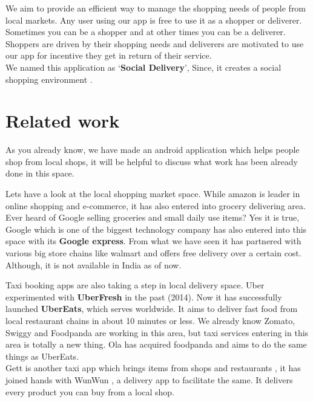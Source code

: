 \documentclass{report}
\begin{document}
We aim to provide an efficient way to manage the shopping needs of people from local markets. Any user using our app is free to use it as a shopper or deliverer. Sometimes you can be a shopper and at other times you can be a deliverer. Shoppers are driven by their shopping needs and deliverers are motivated to use our app for incentive they get in return of their service.\\  

We named this application as `\textbf{Social Delivery}', Since,  it creates a social shopping environment . \\



\chapter{Related work}
\bigskip
\bigskip
\par As you already know,  we have made an android application which helps people shop from local shops, it will be helpful to discuss what work has been already done in this space.\\

\par Let\textquotesingle s have a look at the local shopping market space. While amazon is leader in online shopping and e-commerce, it has also entered into grocery delivering area. Ever heard of Google selling groceries and small daily use items? Yes it is true, Google which is one of the biggest technology company has also entered into this space with its
\textbf{Google express\cite{c7}}. From what we have seen it has partnered  with various big store chains like walmart and offers free delivery over a certain cost. Although, it is not available in India as of now.\\

\par Taxi booking apps are also taking a step in local delivery space. Uber experimented with \textbf{UberFresh\cite{c1}} in the past (2014). Now it has successfully launched \textbf{UberEats\cite{c3}}, which serves worldwide.  It aims to deliver fast food from local restaurant chains in about 10 minutes or less. We already know Zomato, Swiggy and Foodpanda are working in this area, but taxi services entering in this area is totally a new thing. Ola has acquired foodpanda and aims to do the same things as UberEats.\\
Gett is another taxi app which brings items from shops and restaurants , it has joined hands with WunWun , a delivery app to facilitate the same. It delivers every product you can buy from a local shop. \\
\end{document}

